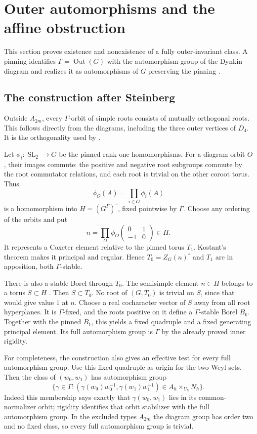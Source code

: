 \documentclass[11pt]{article}
\newcommand{\Out}{\operatorname{Out}}\newcommand{\Inn}{\operatorname{Inn}}
\newcommand{\SL}{\operatorname{SL}}\newcommand{\PGL}{\operatorname{PGL}}
\theoremstyle{definition}\newtheorem{definition}[theorem]{Definition}
\theoremstyle{remark}\newtheorem{remark}[theorem]{Remark}
\begin{document}
\section{Outer automorphisms and the affine obstruction}\label{sec:outer}
This section proves existence and nonexistence of a fully outer-invariant class. A pinning identifies $\Gamma=\Out(G)$ with the automorphism group of the Dynkin diagram and realizes it as automorphisms of $G$ preserving the pinning \citep[Propositions~23.44--23.45 and Corollaries~23.46--23.47, pp.~497--498]{Milne2017}.

\subsection{The construction after Steinberg}
Outside $A_{2m}$, every $\Gamma$-orbit of simple roots consists of mutually orthogonal roots. This follows directly from the diagrams, including the three outer vertices of $D_4$. It is the orthogonality used by \citet[proof of Theorem~9.4, pp.~72--73]{Steinberg1965}.

Let $\phi_i:\SL_2\to G$ be the pinned rank-one homomorphisms. For a diagram orbit $O$, their images commute: the positive and negative root subgroups commute by the root commutator relations, and each root is trivial on the other coroot torus. Thus
\[
 \phi_O(A)=\prod_{i\in O}\phi_i(A)
\]
is a homomorphism into $H=(G^\Gamma)^\circ$, fixed pointwise by $\Gamma$. Choose any ordering of the orbits and put
\[
 n=\prod_O\phi_O\begin{pmatrix}0&1\\-1&0\end{pmatrix}\in H.
\]
It represents a Coxeter element relative to the pinned torus $T_1$. Kostant's theorem makes it principal and regular. Hence $T_0=Z_G(n)^\circ$ and $T_1$ are in apposition, both $\Gamma$-stable.

There is also a stable Borel through $T_0$. The semisimple element $n\in H$ belongs to a torus $S\subset H$ \citep[Corollary~17.36, p.~363]{Milne2017}. Then $S\subset T_0$. No root of $(G,T_0)$ is trivial on $S$, since that would give value $1$ at $n$. Choose a real cocharacter vector of $S$ away from all root hyperplanes. It is $\Gamma$-fixed, and the roots positive on it define a $\Gamma$-stable Borel $B_0$. Together with the pinned $B_1$, this yields a fixed quadruple and a fixed generating principal element. Its full automorphism group is $\Gamma$ by the already proved inner rigidity.

For completeness, the construction also gives an effective test for every full automorphism group. Use this fixed quadruple as origin for the two Weyl sets. Then the class of $(w_0,w_1)$ has automorphism group
\[
 \{\gamma\in\Gamma:
 (\gamma(w_0)w_0^{-1},\gamma(w_1)w_1^{-1})
          \in A_h\times_{U_h}N_h\}.
\]
Indeed this membership says exactly that $\gamma(w_0,w_1)$ lies in its common-normalizer orbit; rigidity identifies that orbit stabilizer with the full automorphism group. In the excluded types $A_{2m}$ the diagram group has order two and no fixed class, so every full automorphism group is trivial.
\end{document}
